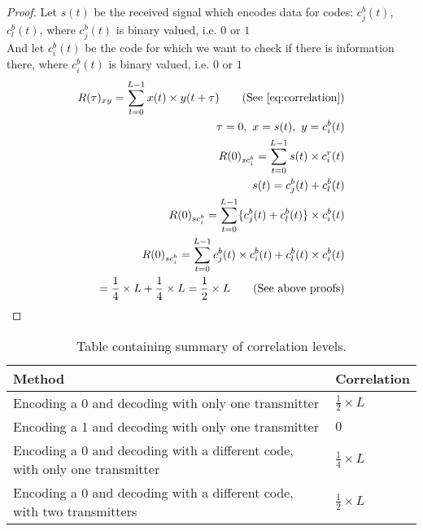 		\begin{proof}
			Let $s(t)$ be the received signal which encodes data for codes: $c^b_j(t)$, $c^b_l(t)$, where $c^b_j(t)$ is binary valued, i.e. $0$ or $1$\\
			And let $c^b_i(t)$ be the code for which we want to check if there is information there, where $c^b_i(t)$ is binary valued, i.e. $0$ or $1$ \\

			\begin{align*}
				R(\tau)_{xy} = \displaystyle\sum_{t = 0} ^ {L - 1} x(t) \times y(t + \tau)	\tag{See \autoref{eq:correlation}}
				\\ \tau = 0,\ x = s(t),\ y = c^b_i(t)	
				\\ R(0)_{sc^b_{i}} = \displaystyle\sum_{t = 0} ^ {L - 1} s(t) \times c^r_i(t)	
				\\ s(t) = c^b_j(t) + c^b_l(t)														
				\\ R(0)_{sc^b_{i}} = \displaystyle\sum_{t = 0} ^ {L - 1} \{ c^b_j(t) + c^b_l(t) \} \times c^b_i(t)
				\\ R(0)_{sc^b_{i}} = \displaystyle\sum_{t = 0} ^ {L - 1} c^b_j(t) \times c^b_i(t) + c^b_l(t) \times c^b_i(t)
				\\ = \frac{1}{4} \times L + \frac{1}{4} \times L = \frac{1}{2} \times L \tag{See above proofs}
			\end{align*}

		\end{proof}



		\begin{table}[h!]
			\centering
			
			\begin{tabular}{| l | l |}
				\hline
				Method												& Correlation \\ \hline \hline
				Encoding a 0 and decoding with only one transmitter 							& $\frac{1}{2} \times L$  \\ \hline
				Encoding a 1 and decoding with only one transmitter 							& $ 0 $   \\ \hline
				Encoding a 0 and decoding with a different code, with only one transmitter 		& $\frac{1}{4} \times L$  \\ \hline
				Encoding a 0 and decoding with a different code, with two transmitters			& $\frac{1}{2} \times L$  \\ \hline
			\end{tabular}
			\caption{Table containing summary of correlation levels.}
			\label{tbl:correlation-levels-bin}
		\end{table}

